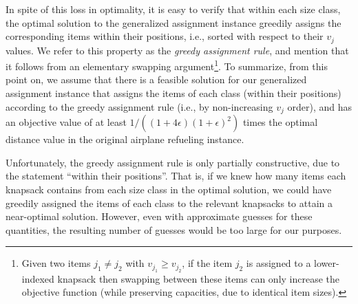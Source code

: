 \documentclass[11pt]{article}
\theoremstyle{plain}
\theoremstyle{definition}
\begin{document}
In spite of this loss in optimality, it is easy to verify that within each size class, the optimal solution to the generalized assignment instance greedily assigns the corresponding items within their positions, i.e., sorted with respect to their $v_j$ values. We refer to this property as the {\em greedy assignment rule}, and mention that it follows from an elementary swapping argument\footnote{Given two items $j_1 \neq j_2$ with $v_{j_1} \geq v_{j_2}$, if the item $j_2$ is assigned to a lower-indexed knapsack then swapping between these items can only increase the objective function (while preserving capacities, due to identical item sizes).}. To summarize, from this point on, we assume that there is a feasible solution for our generalized assignment instance that assigns the items of each class (within their positions) according to the greedy assignment rule (i.e., by non-increasing $v_j$ order), and has an objective value of at least $1 / ((1+4\epsilon)(1+\epsilon)^2)$ times the optimal distance value in the original airplane refueling instance.

\smallskip {} Unfortunately, the greedy assignment rule is only partially constructive, due to the statement ``within their positions''. That is, if we knew how many items each knapsack contains from each size class in the optimal solution, we could have greedily assigned the items of each class to the relevant knapsacks to attain a near-optimal solution. However, even with approximate guesses for these quantities, the resulting number of guesses would be too large for our purposes.
\end{document}
